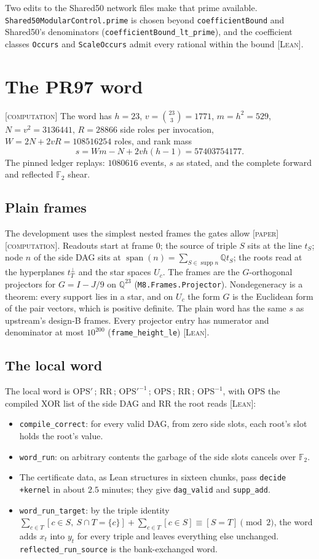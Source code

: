\documentclass[11pt]{amsart}
\theoremstyle{remark}
\newcommand{\Q}{\mathbb{Q}}
\newcommand{\F}{\mathbb{F}}
\newcommand{\lean}[1]{\texttt{#1}}
\newcommand{\tagL}{\textsc{[Lean]}}
\newcommand{\tagP}{\textsc{[paper]}}
\newcommand{\tagC}{\textsc{[computation]}}
\begin{document}
Two edits to the Shared50 network files make that prime available. \lean{Shared50ModularControl.prime}
is chosen beyond \lean{coefficientBound} and Shared50's denominators
(\lean{coefficientBound\_lt\_prime}), and the coefficient classes \lean{Occurs} and
\lean{ScaleOccurs} admit every rational within the bound \tagL.

\section{The PR97 word}\label{sec:word}

\tagC{} The word has $h = 23$, $v = \binom{23}{3} = 1771$, $m = h^2 = 529$, $N = v^2 = 3136441$,
$R = 28866$ side roles per invocation, $W = 2N + 2vR = 108516254$ roles, and rank mass
\[
  s = Wm - N + 2vh(h-1) = 57403754177.
\]
The pinned ledger replays: $1080616$ events, $s$ as stated, and the complete forward and
reflected $\F_2$ shear.

\subsection{Plain frames}
The development uses the simplest nested frames the gates allow \tagP\tagC. Readouts start at
frame $0$; the source of triple $S$ sits at the line $t_S$; node $n$ of the side DAG sits at
$\operatorname{span}(n) = \sum_{S \in \operatorname{supp} n} \Q t_S$; the roots read at the
hyperplanes $t_T^{\perp}$ and the star spaces $U_c$. The frames are the $G$-orthogonal
projectors for $G = I - J/9$ on $\Q^{23}$ (\lean{M8.Frames.Projector}). Nondegeneracy is a
theorem: every support lies in a star, and on $U_c$ the form $G$ is the Euclidean form of the
pair vectors, which is positive definite. The plain word has the same $s$ as upstream's
design-B frames. Every projector entry has numerator and denominator at most $10^{200}$
(\lean{frame\_height\_le}) \tagL.

\subsection{The local word}
The local word is $\mathrm{OPS}' \,;\, \mathrm{RR} \,;\, \mathrm{OPS}'^{-1} \,;\, \mathrm{OPS}
\,;\, \mathrm{RR} \,;\, \mathrm{OPS}^{-1}$, with $\mathrm{OPS}$ the compiled XOR list of the side
DAG and $\mathrm{RR}$ the root reads \tagL:
\begin{itemize}
\item \lean{compile\_correct}: for every valid DAG, from zero side slots, each root's slot holds
  the root's value.
\item \lean{word\_run}: on arbitrary contents the garbage of the side slots cancels over $\F_2$.
\item The certificate data, as Lean structures in sixteen chunks, pass \lean{decide +kernel} in
  about $2.5$ minutes; they give \lean{dag\_valid} and \lean{supp\_add}.
\item \lean{word\_run\_target}: by the triple identity
  $\sum_{c \in T}[c \in S,\ S \cap T = \{c\}] + \sum_{c \in T}[c \in S] \equiv [S = T] \pmod 2$,
  the word adds $x_t$ into $y_t$ for every triple and leaves everything else unchanged.
  \lean{reflected\_run\_source} is the bank-exchanged word.
\end{itemize}
\end{document}
